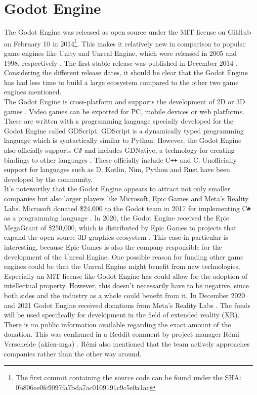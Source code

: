 \section{Godot Engine}
The Godot Engine was released as open source under the MIT license on GitHub on February 10 in 2014\footnote{The first commit containing the source code can be found under the SHA:\\ 0b806ee0fc9097fa7bda7ac0109191c9c5e0a1ac}\cite{godot-repository}.
This makes it relatively new in comparison to popular game engines like Unity and Unreal Engine, which were released in 2005 and 1998, respectively \cite{unity-release, unreal-release}.
The first stable release was published in December 2014 \cite{godot-release}.
Considering the different release dates, it should be clear that the Godot Engine has had less time to build a large ecosystem compared to the other two game engines mentioned.\\

The Godot Engine is cross-platform and supports the development of 2D or 3D games \cite{godot-engine}.
Video games can be exported for PC, mobile devices or web platforms.
These are written with a programming language specially developed for the Godot Engine called GDScript.
GDScript is a dynamically typed programming language which is syntactically similar to Python.
However, the Godot Engine also officially supports C\texttt{\#} and includes GDNative, a technology for creating bindings to other languages \cite{godot-gdnative}.
These officially include C\texttt{++} and C.
Unofficially support for languages such as D, Kotlin, Nim, Python and Rust have been developed by the community.\\

It's noteworthy that the Godot Engine appears to attract not only smaller companies but also larger players like Microsoft, Epic Games and Meta's Reality Labs.
Microsoft donated \$24,000 to the Godot team in 2017 for implementing C\texttt{\#} as a programming language \cite{godot-csharp}.
In 2020, the Godot Engine received the Epic MegaGrant of \$250,000, which is distributed by Epic Games to projects that expand the open source 3D graphics ecosystem \cite{godot-megagrant}.
This case in particular is interesting, because Epic Games is also the company responsible for the development of the Unreal Engine.
One possible reason for funding other game engines could be that the Unreal Engine might benefit from new technologies.
Especially an MIT license like Godot Engine has could allow for the adoption of intellectual property. 
However, this doesn't necessarily have to be negative, since both sides and the industry as a whole could benefit from it.
In December 2020 and 2021 Godot Engine received donations from Meta's Reality Labs \cite{godot-facebook-reality, godot-meta-reality}.
The funds will be used specifically for development in the field of extended reality (XR).
There is no public information available regarding the exact amount of the donation.
This was confirmed in a Reddit comment by project manager Rémi Verschelde (akien-mga) \cite{reddit-companies-akien}.
Rémi also mentioned that the team actively approaches companies rather than the other way around.
